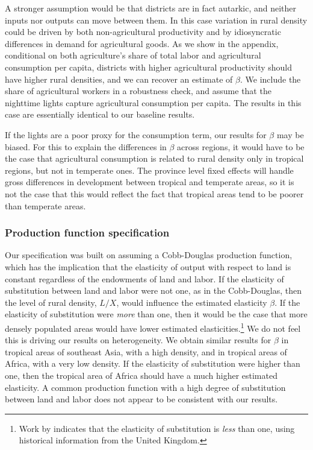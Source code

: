 \documentclass[11pt]{article}
\begin{document}
A stronger assumption would be that districts are in fact autarkic, and neither inputs nor outputs can move between them. In this case variation in rural density could be driven by both non-agricultural productivity and by idiosyncratic differences in demand for agricultural goods. As we show in the appendix, conditional on both agriculture's share of total labor and agricultural consumption per capita, districts with higher agricultural productivity should have higher rural densities, and we can recover an estimate of $\beta$. We include the share of agricultural workers in a robustness check, and assume that the nighttime lights capture agricultural consumption per capita. The results in this case are essentially identical to our baseline results. 

If the lights are a poor proxy for the consumption term, our results for $\beta$ may be biased. For this to explain the differences in $\beta$ across regions, it would have to be the case that agricultural consumption is related to rural density only in tropical regions, but not in temperate ones. The province level fixed effects will handle gross differences in development between tropical and temperate areas, so it is not the case that this would reflect the fact that tropical areas tend to be poorer than temperate areas. 

\subsubsection{Production function specification} 
Our specification was built on assuming a Cobb-Douglas production function, which has the implication that the elasticity of output with respect to land is constant regardless of the endowments of land and labor. If the elasticity of substitution between land and labor were not one, as in the Cobb-Douglas, then the level of rural density, $L/X$, would influence the estimated elasticity $\beta$. If the elasticity of substitution were \textit{more} than one, then it would be the case that more densely populated areas would have lower estimated elasticities.\footnote{Work by \citet{wilde2012} indicates that the elasticity of substitution is \textit{less} than one, using historical information from the United Kingdom.} We do not feel this is driving our results on heterogeneity. We obtain similar results for $\beta$ in tropical areas of southeast Asia, with a high density, and in tropical areas of Africa, with a very low density. If the elasticity of substitution were higher than one, then the tropical area of Africa should have a much higher estimated elasticity. A common production function with a high degree of substitution between land and labor does not appear to be consistent with our results.
\end{document}
